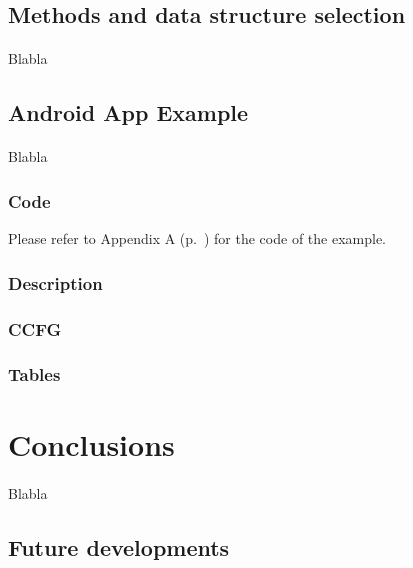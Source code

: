 \documentclass[letterpaper,twocolumn,10pt]{article}
\begin{document}
\subsection{Methods and data structure selection}
\paragraph{}
Blabla

\subsection{Android App Example}
\paragraph{}
Blabla

\subsubsection{Code}
Please refer to Appendix A (p.~\pageref{app:appendixA}) for the code of the example.

\subsubsection{Description}

\subsubsection{CCFG}

\subsubsection{Tables}


\section{Conclusions}
\paragraph{}
Blabla

\subsection{Future developments}
\end{document}
